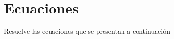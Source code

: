 \documentclass[11pt]{article}
\begin{document}













\section{Ecuaciones}

Resuelve las ecuaciones que se presentan a continuaci\'on
\setcounter{equation}{0}
\end{document}
